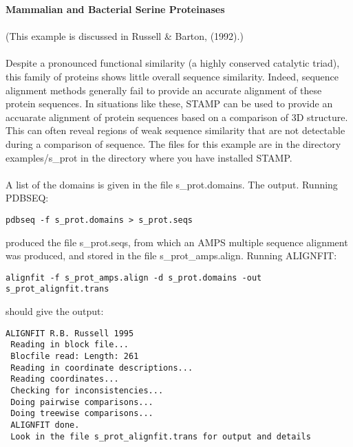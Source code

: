 {\bf Mammalian and Bacterial Serine Proteinases}\\
\\
(This example is discussed in Russell \& Barton, (1992).\nocite{rb92b})\\
\\
Despite a pronounced functional similarity (a highly conserved catalytic 
triad), this family of proteins shows little overall sequence similarity.  
Indeed, sequence alignment methods generally fail to provide an accurate
alignment of these protein sequences.  In situations like these, STAMP 
can be used to provide an accuarate alignment of protein sequences based 
on a comparison of 3D structure.  This can often reveal regions of weak 
sequence similarity that are not detectable during a comparison of 
sequence.  The files for this example are in the directory examples/s\_prot in the 
directory where you have installed STAMP.\\
\\
A list of the domains is given in the file s\_prot.domains. The
output.  Running PDBSEQ:\\

\begin{scriptsize}\begin{verbatim}
pdbseq -f s_prot.domains > s_prot.seqs
\end{verbatim} \end{scriptsize}

produced the file s\_prot.seqs, from which an AMPS multiple
sequence alignment was produced, and stored in the file 
s\_prot\_amps.align.  Running ALIGNFIT:\\

\begin{scriptsize}\begin{verbatim}
alignfit -f s_prot_amps.align -d s_prot.domains -out s_prot_alignfit.trans
\end{verbatim} \end{scriptsize}

should give the output:\\

\begin{scriptsize}\begin{verbatim}
ALIGNFIT R.B. Russell 1995
 Reading in block file...
 Blocfile read: Length: 261
 Reading in coordinate descriptions...
 Reading coordinates...
 Checking for inconsistencies...
 Doing pairwise comparisons...
 Doing treewise comparisons...
 ALIGNFIT done.
 Look in the file s_prot_alignfit.trans for output and details
\end{verbatim} \end{scriptsize}

